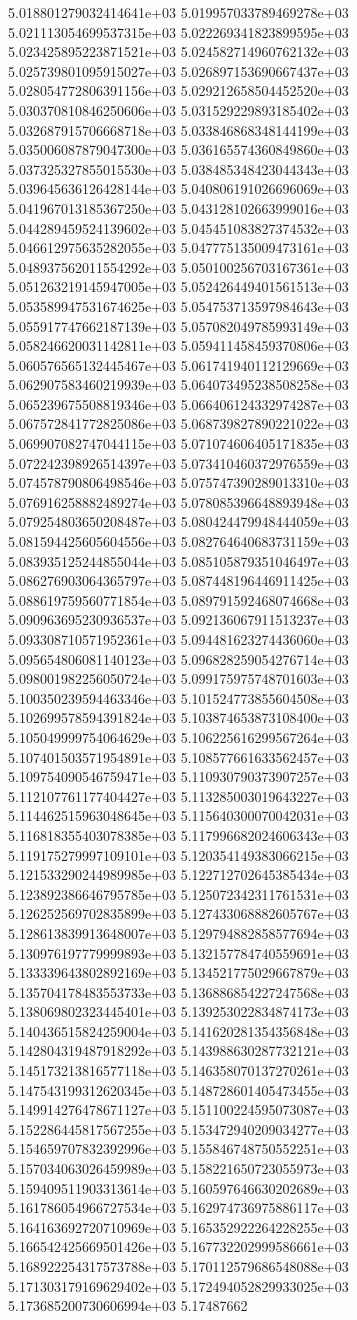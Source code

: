 	5.018801279032414641e+03	5.019957033789469278e+03	5.021113054699537315e+03	5.022269341823899595e+03	5.023425895223871521e+03	5.024582714960762132e+03	5.025739801095915027e+03	5.026897153690667437e+03	5.028054772806391156e+03	5.029212658504452520e+03	5.030370810846250606e+03	5.031529229893185402e+03	5.032687915706668718e+03	5.033846868348144199e+03	5.035006087879047300e+03	5.036165574360849860e+03	5.037325327855015530e+03	5.038485348423044343e+03	5.039645636126428144e+03	5.040806191026696069e+03	5.041967013185367250e+03	5.043128102663999016e+03	5.044289459524139602e+03	5.045451083827374532e+03	5.046612975635282055e+03	5.047775135009473161e+03	5.048937562011554292e+03	5.050100256703167361e+03	5.051263219145947005e+03	5.052426449401561513e+03	5.053589947531674625e+03	5.054753713597984643e+03	5.055917747662187139e+03	5.057082049785993149e+03	5.058246620031142811e+03	5.059411458459370806e+03	5.060576565132445467e+03	5.061741940112129669e+03	5.062907583460219939e+03	5.064073495238508258e+03	5.065239675508819346e+03	5.066406124332974287e+03	5.067572841772825086e+03	5.068739827890221022e+03	5.069907082747044115e+03	5.071074606405171835e+03	5.072242398926514397e+03	5.073410460372976559e+03	5.074578790806498546e+03	5.075747390289013310e+03	5.076916258882489274e+03	5.078085396648893948e+03	5.079254803650208487e+03	5.080424479948444059e+03	5.081594425605604556e+03	5.082764640683731159e+03	5.083935125244855044e+03	5.085105879351046497e+03	5.086276903064365797e+03	5.087448196446911425e+03	5.088619759560771854e+03	5.089791592468074668e+03	5.090963695230936537e+03	5.092136067911513237e+03	5.093308710571952361e+03	5.094481623274436060e+03	5.095654806081140123e+03	5.096828259054276714e+03	5.098001982256050724e+03	5.099175975748701603e+03	5.100350239594463346e+03	5.101524773855604508e+03	5.102699578594391824e+03	5.103874653873108400e+03	5.105049999754064629e+03	5.106225616299567264e+03	5.107401503571954891e+03	5.108577661633562457e+03	5.109754090546759471e+03	5.110930790373907257e+03	5.112107761177404427e+03	5.113285003019643227e+03	5.114462515963048645e+03	5.115640300070042031e+03	5.116818355403078385e+03	5.117996682024606343e+03	5.119175279997109101e+03	5.120354149383066215e+03	5.121533290244989985e+03	5.122712702645385434e+03	5.123892386646795785e+03	5.125072342311761531e+03	5.126252569702835899e+03	5.127433068882605767e+03	5.128613839913648007e+03	5.129794882858577694e+03	5.130976197779999893e+03	5.132157784740559691e+03	5.133339643802892169e+03	5.134521775029667879e+03	5.135704178483553733e+03	5.136886854227247568e+03	5.138069802323445401e+03	5.139253022834874173e+03	5.140436515824259004e+03	5.141620281354356848e+03	5.142804319487918292e+03	5.143988630287732121e+03	5.145173213816577118e+03	5.146358070137270261e+03	5.147543199312620345e+03	5.148728601405473455e+03	5.149914276478671127e+03	5.151100224595073087e+03	5.152286445817567255e+03	5.153472940209034277e+03	5.154659707832392996e+03	5.155846748750552251e+03	5.157034063026459989e+03	5.158221650723055973e+03	5.159409511903313614e+03	5.160597646630202689e+03	5.161786054966727534e+03	5.162974736975886117e+03	5.164163692720710969e+03	5.165352922264228255e+03	5.166542425669501426e+03	5.167732202999586661e+03	5.168922254317573788e+03	5.170112579686548088e+03	5.171303179169629402e+03	5.172494052829933025e+03	5.173685200730606994e+03	5.17487662